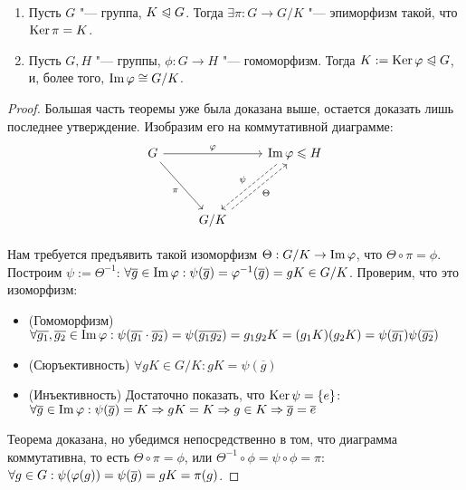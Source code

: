 \begin{theorem}~
	\begin{enumerate}
		\item Пусть $G$ "--- группа, $K \trianglelefteqslant G$. Тогда $\exists \pi: G \to G / K$ "--- эпиморфизм такой, что $\ke\pi \hm= K$.
		\item Пусть $G, H$ "--- группы, $\phi: G \to H$ "--- гомоморфизм. Тогда $K \hm{:=} \ke\phi \normal G$, и, более того, $\operatorname{Im}\varphi \cong G / K$.
	\end{enumerate}
\end{theorem}

\begin{proof}
	Большая часть теоремы уже была доказана выше, остается доказать лишь последнее утверждение. Изобразим его на коммутативной диаграмме:
	\[
	\begin{tikzcd}[row sep = huge]
		G \arrow{rr}{\phi} \arrow[swap]{dr}{\pi} && \im\phi \le H \arrow[dashrightarrow, swap, xshift = -4pt]{dl}{\psi}\\
		& G / K \arrow[dashrightarrow, swap, xshift = 4pt]{ur}{\Theta} &
	\end{tikzcd}
	\]
	
	Нам требуется предъявить такой изоморфизм $\Theta: G / K \to \operatorname{Im}\varphi$, что $\Theta \circ \pi = \phi$. Построим $\psi := \Theta^{-1}$: $\forall \overline{g} \in \im\phi: \psi(\overline{g}) = \phi^{-1}(\overline{g}) \hm= gK \in G / K$. Проверим, что это изоморфизм:
	\begin{itemize}
		\item (Гомоморфизм) $\forall \overline{g_1}, \overline{g_2} \in \im\phi: \psi(\overline{g_1}\cdot\overline{g_2}) = \psi(\overline{g_1g_2}) = g_1g_2K \hm= (g_1K)(g_2K) = \psi(\overline{g_1})\psi(\overline{g_2})$
		\item (Сюръективность) $\forall gK \in G / K: gK = \psi(\overline{g})$
		\item (Инъективность) Достаточно показать, что $\operatorname{Ker}\psi = \{e\}$: $\forall \overline{g} \hm\in \im\phi: \psi(\overline{g}) = K \hm\Rightarrow gK = K \Rightarrow g \in K \Rightarrow \overline{g} = \overline{e}$
	\end{itemize}
	
	Теорема доказана, но убедимся непосредственно в том, что диаграмма коммутативна, то есть $\Theta \circ \pi = \phi$, или $\Theta^{-1} \circ \phi = \psi \circ \phi = \pi$: $\forall g \hm\in G: \psi(\phi(g)) = \psi(\overline{g}) = gK = \pi(g)$.
\end{proof}

